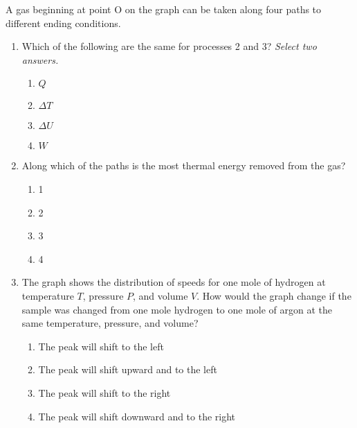 \documentclass{../../oss-apphys}
\begin{document}
\begin{multicols}{2}
  A gas beginning at point O on the graph can be taken along four paths to
  different ending conditions.
  \begin{center}
    \vspace{-.15in}
  \end{center}
  \begin{enumerate}[leftmargin=18pt,start=24]

  \item Which of the following are the same for processes 2 and 3?
    \emph{Select two answers.}
    \begin{enumerate}[noitemsep,topsep=0pt,leftmargin=18pt,label=(\Alph*)]
    \item $Q$
    \item $\Delta T$
    \item $\Delta U$
    \item $W$
    \end{enumerate}
    
  \item Along which of the paths is the most thermal energy removed from the
    gas?
    \begin{enumerate}[noitemsep,topsep=0pt,leftmargin=18pt,label=(\Alph*)]
      \item\num{1}
      \item\num{2}
      \item\num{3}
      \item\num{4}
    \end{enumerate}

    \columnbreak
    
  \item The graph shows the distribution of speeds for one mole of hydrogen at
    temperature $T$, pressure $P$, and volume $V$. How would the graph change
    if the sample was changed from one mole hydrogen to one mole of argon at
    the same temperature, pressure, and volume?
    \begin{center}
      \vspace{-.15in}
    \end{center}
    \begin{enumerate}[noitemsep,topsep=0pt,leftmargin=18pt,label=(\Alph*)]
    \item The peak will shift to the left
    \item The peak will shift upward and to the left
    \item The peak will shift to the right
    \item The peak will shift downward and to the right
    \end{enumerate}
    

\end{enumerate}
\end{multicols}
\end{document}

